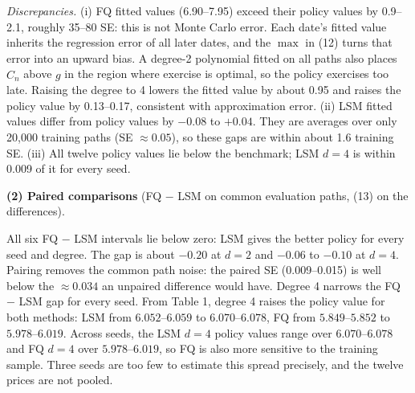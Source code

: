 \documentclass[10pt]{article}
\newcommand{\Ch}{\widehat C}
\begin{document}
\begin{table}[H]\centering\small

\caption{Twelve frozen policies. Policy value, SE and CI from (13) on the evaluation set. Times
exclude path simulation ($\approx$0.04\,s per training set, 0.21\,s for the evaluation set; see
\texttt{results.csv}).}
\end{table}
\vspace{-2mm}
\emph{Discrepancies.} (i) FQ fitted values (6.90--7.95) exceed their policy values by 0.9--2.1,
roughly 35--80 SE: this is not Monte Carlo error. Each date's fitted value inherits the regression
error of all later dates, and the $\max$ in (12) turns that error into an upward bias. A degree-2
polynomial fitted on all paths also places $\Ch_n$ above $g$ in the region where exercise is
optimal, so the policy exercises too late. Raising the degree to 4 lowers the fitted value by about
0.95 and raises the policy value by 0.13--0.17, consistent with approximation error.
(ii) LSM fitted values differ from policy values by $-0.08$ to $+0.04$. They are averages over only
20,000 training paths (SE $\approx 0.05$), so these gaps are within about 1.6 training SE.
(iii) All twelve policy values lie below the benchmark; LSM $d=4$ is within 0.009 of it for every seed.

\textbf{(2) Paired comparisons} (FQ $-$ LSM on common evaluation paths, (13) on the differences).

\begin{table}[H]\centering\small

\caption{FQ $-$ LSM by seed and degree (\texttt{paired.csv}).}
\end{table}
\vspace{-2mm}
All six FQ $-$ LSM intervals lie below zero: LSM gives the better policy for every seed and degree.
The gap is about $-0.20$ at $d=2$ and $-0.06$ to $-0.10$ at $d=4$. Pairing removes the common path
noise: the paired SE (0.009--0.015) is well below the $\approx0.034$ an unpaired difference would have.
Degree 4 narrows the FQ $-$ LSM gap for every seed. From Table 1, degree 4 raises the policy value for both
methods: LSM from $6.052$--$6.059$ to $6.070$--$6.078$, FQ from $5.849$--$5.852$ to $5.978$--$6.019$. Across seeds, the LSM $d=4$ policy values range over $6.070$--$6.078$ and FQ $d=4$
over $5.978$--$6.019$, so FQ is also more sensitive to the training sample. Three seeds are too few to
estimate this spread precisely, and the twelve prices are not pooled.
\end{document}

